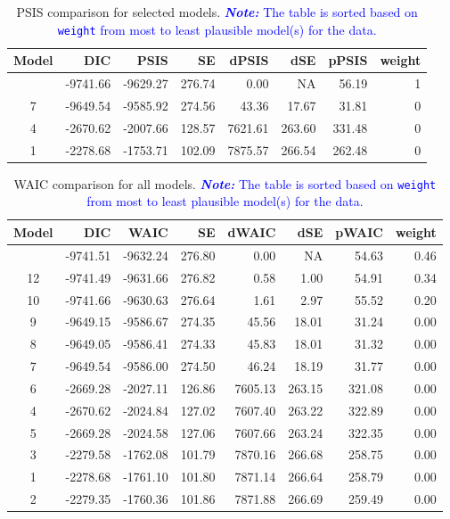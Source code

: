 \documentclass[
  authoryear,
  preprint,
  1p]{elsarticle}
\begin{document}
\begin{longtable}[]{@{}crrrrrrr@{}}

\caption{\label{tbl-rq1-psis}PSIS comparison for selected models.
\textcolor{blue}{\textbf{\emph{Note:}} The table is sorted based on \texttt{weight} from
most to least plausible model(s) for the data.}}

\tabularnewline

\toprule\noalign{}
Model & DIC & PSIS & SE & dPSIS & dSE & pPSIS & weight \\
\midrule\noalign{}
\endhead
\bottomrule\noalign{}
\endlastfoot
10 & -9741.66 & -9629.27 & 276.74 & 0.00 & NA & 56.19 & 1 \\
7 & -9649.54 & -9585.92 & 274.56 & 43.36 & 17.67 & 31.81 & 0 \\
4 & -2670.62 & -2007.66 & 128.57 & 7621.61 & 263.60 & 331.48 & 0 \\
1 & -2278.68 & -1753.71 & 102.09 & 7875.57 & 266.54 & 262.48 & 0 \\

\end{longtable}

\begin{longtable}[]{@{}crrrrrrr@{}}

\caption{\label{tbl-rq3-waic}WAIC comparison for all models.
\textcolor{blue}{\textbf{\emph{Note:}} The table is sorted based on \texttt{weight} from
most to least plausible model(s) for the data.}}

\tabularnewline

\toprule\noalign{}
Model & DIC & WAIC & SE & dWAIC & dSE & pWAIC & weight \\
\midrule\noalign{}
\endhead
\bottomrule\noalign{}
\endlastfoot
11 & -9741.51 & -9632.24 & 276.80 & 0.00 & NA & 54.63 & 0.46 \\
12 & -9741.49 & -9631.66 & 276.82 & 0.58 & 1.00 & 54.91 & 0.34 \\
10 & -9741.66 & -9630.63 & 276.64 & 1.61 & 2.97 & 55.52 & 0.20 \\
9 & -9649.15 & -9586.67 & 274.35 & 45.56 & 18.01 & 31.24 & 0.00 \\
8 & -9649.05 & -9586.41 & 274.33 & 45.83 & 18.01 & 31.32 & 0.00 \\
7 & -9649.54 & -9586.00 & 274.50 & 46.24 & 18.19 & 31.77 & 0.00 \\
6 & -2669.28 & -2027.11 & 126.86 & 7605.13 & 263.15 & 321.08 & 0.00 \\
4 & -2670.62 & -2024.84 & 127.02 & 7607.40 & 263.22 & 322.89 & 0.00 \\
5 & -2669.28 & -2024.58 & 127.06 & 7607.66 & 263.24 & 322.35 & 0.00 \\
3 & -2279.58 & -1762.08 & 101.79 & 7870.16 & 266.68 & 258.75 & 0.00 \\
1 & -2278.68 & -1761.10 & 101.80 & 7871.14 & 266.64 & 258.79 & 0.00 \\
2 & -2279.35 & -1760.36 & 101.86 & 7871.88 & 266.69 & 259.49 & 0.00 \\

\end{longtable}
\end{document}
